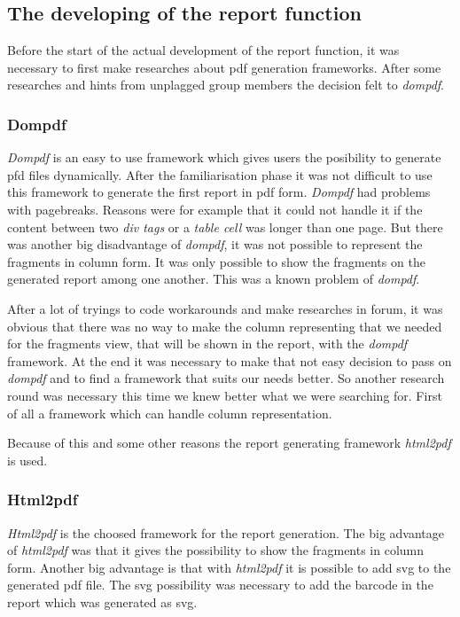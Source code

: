 \subsection{The developing of the report function}

Before the start of the actual development of the report function, it was necessary to first make researches about pdf generation frameworks. After some researches and hints from unplagged group members the decision felt to \textit{dompdf}. 

\subsubsection{Dompdf}

\textit{Dompdf} is an easy to use framework which gives users the posibility to generate pfd files dynamically. After the familiarisation phase it was not difficult to use this framework to generate the first report in pdf form. \textit{Dompdf} had problems with pagebreaks. Reasons were for example that it could not handle it if the content between two \textit{div tags} or a \textit{table cell} was longer than one page.
But there was another big disadvantage of \textit{dompdf}, it was not possible to represent the fragments in column form. It was only possible to show the fragments on the generated report among one another. This was a known problem of \textit{dompdf}.

After a lot of tryings to code workarounds and make researches in forum, it was obvious that there was no way to make the column representing that we needed for the fragments view, that will be shown in the report, with the \textit{dompdf} framework. At the end it was necessary to make that not easy decision to pass on \textit{dompdf} and to find a framework that suits our needs better.
So another research round was necessary this time we knew better what we were searching for. First of all a framework which can handle column representation.

Because of this and some other reasons the report generating framework \textit{html2pdf} is used.

\subsubsection{Html2pdf}

\textit{Html2pdf} is the choosed framework for the report generation. The big advantage of \textit{html2pdf} was that it gives the possibility to show the fragments in column form. Another big advantage is that with \textit{html2pdf} it is possible to add svg to the generated pdf file. The svg possibility was necessary to add the barcode in the report which was generated as svg.

